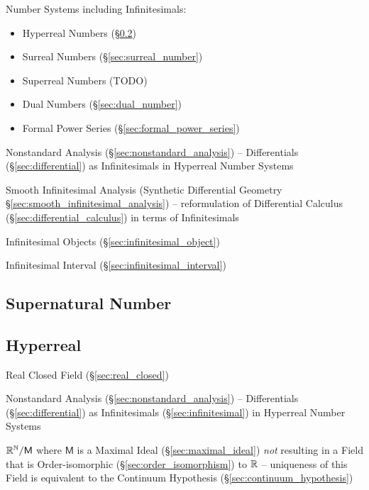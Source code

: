 Number Systems including Infinitesimals:
\begin{itemize}
  \item Hyperreal Numbers (\S\ref{sec:hyperreal})
  \item Surreal Numbers (\S\ref{sec:surreal_number})
  \item Superreal Numbers (TODO)
  \item Dual Numbers (\S\ref{sec:dual_number})
  \item Formal Power Series (\S\ref{sec:formal_power_series})
\end{itemize}

\fist Nonstandard Analysis (\S\ref{sec:nonstandard_analysis}) -- Differentials
(\S\ref{sec:differential}) as Infinitesimals in Hyperreal Number Systems

\fist Smooth Infinitesimal Analysis (Synthetic Differential Geometry
\S\ref{sec:smooth_infinitesimal_analysis}) -- reformulation of Differential
Calculus (\S\ref{sec:differential_calculus}) in terms of Infinitesimals

\fist Infinitesimal Objects (\S\ref{sec:infinitesimal_object})

\fist Infinitesimal Interval (\S\ref{sec:infinitesimal_interval})



\subsection{Supernatural Number}\label{sec:supernatural_number}

\subsection{Hyperreal}\label{sec:hyperreal}

Real Closed Field (\S\ref{sec:real_closed})

\fist Nonstandard Analysis (\S\ref{sec:nonstandard_analysis}) -- Differentials
  (\S\ref{sec:differential}) as Infinitesimals (\S\ref{sec:infinitesimal}) in
  Hyperreal Number Systems

$\mathbb{R}^{\mathbb{N}} / \mathsf{M}$ where $\mathsf{M}$ is a Maximal Ideal
(\S\ref{sec:maximal_ideal}) \emph{not} resulting in a Field that is
Order-isomorphic (\S\ref{sec:order_isomorphism}) to $\mathbb{R}$ --
uniqueness of this Field is equivalent to the Continuum Hypothesis
(\S\ref{sec:continuum_hypothesis})



